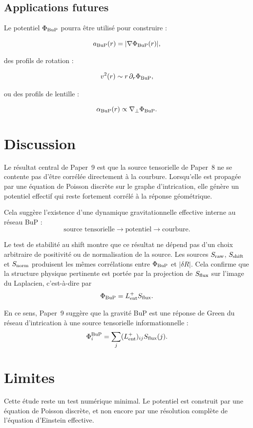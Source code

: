 \documentclass[11pt,a4paper]{article}
\begin{document}
\subsection{Applications futures}

Le potentiel \(\Phi_{\rm BuP}\) pourra être utilisé pour construire :

\[
a_{\rm BuP}(r)=|\nabla\Phi_{\rm BuP}(r)|,
\]

des profils de rotation :

\[
v^2(r)\sim r\,\partial_r\Phi_{\rm BuP},
\]

ou des profils de lentille :

\[
\alpha_{\rm BuP}(r)\propto \nabla_\perp\Phi_{\rm BuP}.
\]

\section{Discussion}

Le résultat central de Paper~9 est que la source tensorielle de Paper~8 ne se
contente pas d'être corrélée directement à la courbure. Lorsqu'elle est
propagée par une équation de Poisson discrète sur le graphe d'intrication, elle
génère un potentiel effectif qui reste fortement corrélé à la réponse
géométrique.

Cela suggère l'existence d'une dynamique gravitationnelle effective interne au
réseau BuP :
\[
\text{source tensorielle}
\longrightarrow
\text{potentiel}
\longrightarrow
\text{courbure}.
\]

Le test de stabilité au shift montre que ce résultat ne dépend pas d'un choix
arbitraire de positivité ou de normalisation de la source. Les sources
\(S_{\rm raw}\), \(S_{\rm shift}\) et \(S_{\rm norm}\) produisent les mêmes
corrélations entre \(\Phi_{\rm BuP}\) et \(|\delta R|\). Cela confirme que la
structure physique pertinente est portée par la projection de \(S_{\rm flux}\)
sur l'image du Laplacien, c'est-à-dire par
\[
\Phi_{\rm BuP}
=
L_{\rm ent}^{+}S_{\rm flux}.
\]

En ce sens, Paper~9 suggère que la gravité BuP est une réponse de Green du
réseau d'intrication à une source tensorielle informationnelle :
\[
\Phi_i^{\rm BuP}
=
\sum_j
(L_{\rm ent}^{+})_{ij}
S_{\rm flux}(j).
\]

\section{Limites}

Cette étude reste un test numérique minimal. Le potentiel est construit par une
équation de Poisson discrète, et non encore par une résolution complète de
l'équation d'Einstein effective.
\end{document}
